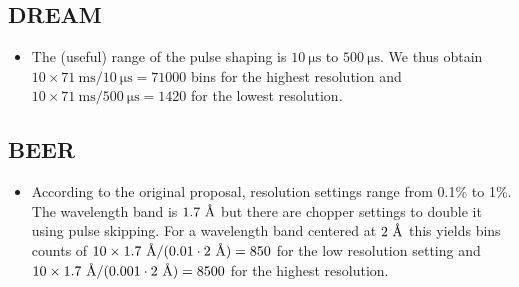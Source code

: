 \documentclass[a4paper,english,numbers=noenddot,bibliography=totoc,chapterprefix=on,DIV=12]{scrartcl}
\newcommand{\angstrom}{\textup{\AA}}
\newcommand{\beer}{BEER\xspace}
\newcommand{\dream}{DREAM\xspace}
\begin{document}
\subsection{\dream}

\begin{itemize}
  \item The (useful) range of the pulse shaping is $10~\mathrm{\mu s}$ to $500~\mathrm{\mu s}$.
    We thus obtain $10\times71~\mathrm{ms}/10~\mathrm{\mu s} = 71000$ bins for the highest resolution and $10\times71~\mathrm{ms}/500~\mathrm{\mu s} = 1420$ for the lowest resolution.
\end{itemize}

\subsection{\beer}

\begin{itemize}
  \item According to the original proposal, resolution settings range from 0.1\% to 1\%. The wavelength band is $1.7~\angstrom$ but there are chopper settings to double it using pulse skipping. For a wavelength band centered at $2~\angstrom$ this yields bins counts of $10\times1.7~\angstrom/(0.01\cdot2~\angstrom) = 850$ for the low resolution setting and $10\times1.7~\angstrom/(0.001\cdot2~\angstrom) = 8500$ for the highest resolution.
\end{itemize}


\end{document}
